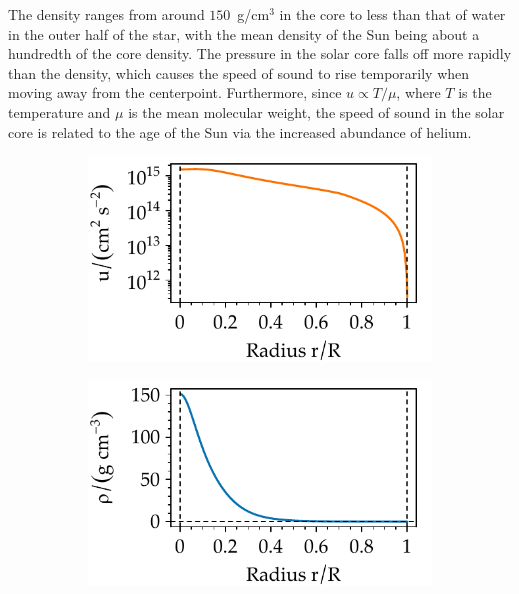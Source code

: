The density ranges from around $150$~g/cm$^3$ in the core to less than that of water in the outer half of the star, with the mean density of the Sun being about a hundredth of the core density. 
The pressure in the solar core falls off more rapidly than the density, which causes the speed of sound to rise temporarily when moving away from the centerpoint. 
Furthermore, since $u\propto T/\mu$, where $T$ is the temperature and $\mu$ is the mean molecular weight, the speed of sound in the solar core is related to the age of the Sun via the increased abundance of helium. 

\begin{figure}
    \centering
    \begin{subfigure}[b]{0.5\linewidth}
        \centering
        \includegraphics[width=\textwidth,keepaspectratio]{figs/pulse/diffs/prof_D-u.pdf}
    \end{subfigure}%
    \begin{subfigure}[b]{0.5\linewidth}
        \centering
        \includegraphics[width=\textwidth,keepaspectratio]{figs/pulse/diffs/prof_D-rho.pdf}%

\end{subfigure}
\end{figure}
